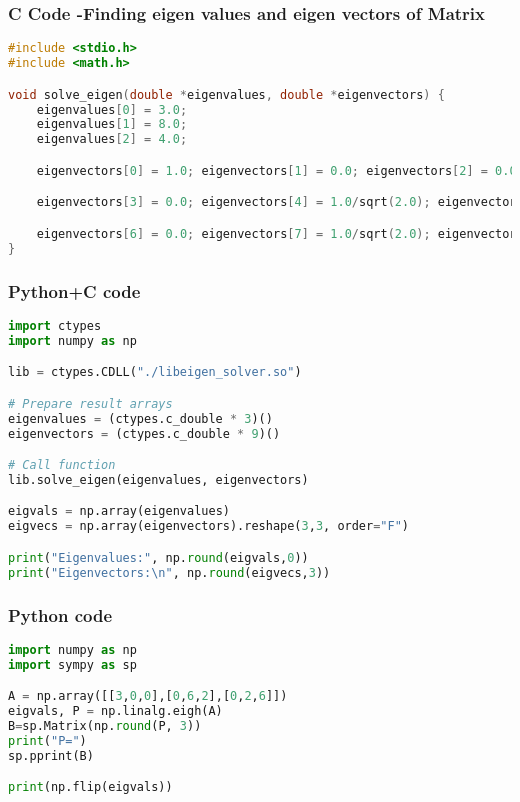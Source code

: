 \documentclass{beamer}
\begin{document}
\begin{frame}[fragile]
    \frametitle{C Code -Finding eigen values and eigen vectors of Matrix}

    \begin{lstlisting}[language=C]
#include <stdio.h>
#include <math.h>

void solve_eigen(double *eigenvalues, double *eigenvectors) {
    eigenvalues[0] = 3.0;
    eigenvalues[1] = 8.0;
    eigenvalues[2] = 4.0;

    eigenvectors[0] = 1.0; eigenvectors[1] = 0.0; eigenvectors[2] = 0.0;

    eigenvectors[3] = 0.0; eigenvectors[4] = 1.0/sqrt(2.0); eigenvectors[5] = 1.0/sqrt(2.0);

    eigenvectors[6] = 0.0; eigenvectors[7] = 1.0/sqrt(2.0); eigenvectors[8] = -1.0/sqrt(2.0);
}


    \end{lstlisting}
\end{frame}




\begin{frame}[fragile]
    \frametitle{Python+C code}

    \begin{lstlisting}[language=Python]
import ctypes
import numpy as np

lib = ctypes.CDLL("./libeigen_solver.so")

# Prepare result arrays
eigenvalues = (ctypes.c_double * 3)()
eigenvectors = (ctypes.c_double * 9)()

# Call function
lib.solve_eigen(eigenvalues, eigenvectors)

eigvals = np.array(eigenvalues)
eigvecs = np.array(eigenvectors).reshape(3,3, order="F")  

print("Eigenvalues:", np.round(eigvals,0))
print("Eigenvectors:\n", np.round(eigvecs,3))
    \end{lstlisting}
\end{frame}

\begin{frame}[fragile]
    \frametitle{Python code}
    \begin{lstlisting}[language=Python]
import numpy as np
import sympy as sp

A = np.array([[3,0,0],[0,6,2],[0,2,6]])
eigvals, P = np.linalg.eigh(A)
B=sp.Matrix(np.round(P, 3))
print("P=")
sp.pprint(B)

print(np.flip(eigvals))
    \end{lstlisting}   
\end{frame}
\end{document}
